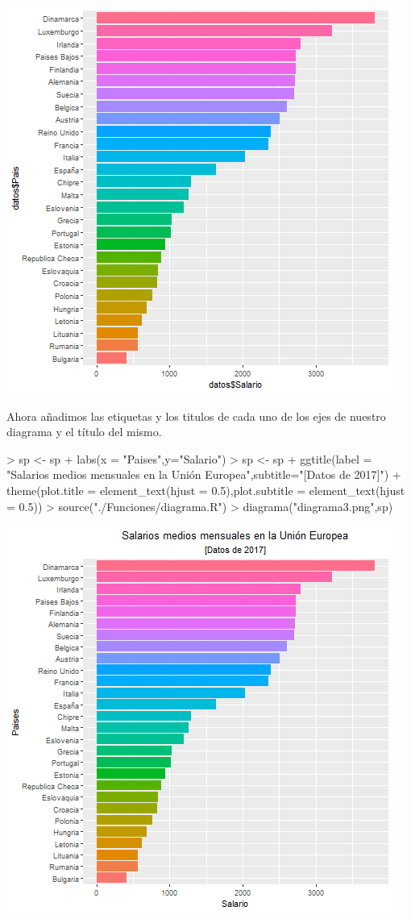 \documentclass [a4paper] {article}
\begin{document}
\includegraphics[width=\textwidth]{diagrama2}

\bigskip
Ahora añadimos las etiquetas y los titulos de cada uno de los ejes de nuestro diagrama y el título del mismo.
\begin{Schunk}
\begin{Sinput}
> sp <- sp + labs(x = "Paises",y="Salario")
> sp <- sp + ggtitle(label = "Salarios medios mensuales en la Unión Europea",subtitle="[Datos de 2017]") + theme(plot.title = element_text(hjust = 0.5),plot.subtitle = element_text(hjust = 0.5))
> source("./Funciones/diagrama.R")
> diagrama("diagrama3.png",sp)
\end{Sinput}
\end{Schunk}

\includegraphics[width=\textwidth]{diagrama3}
\end{document}
